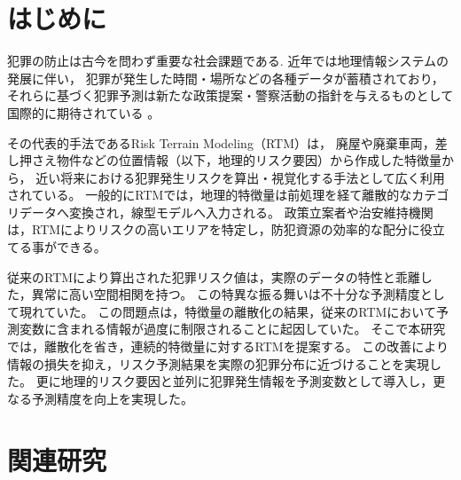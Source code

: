 \section{はじめに}
犯罪の防止は古今を問わず重要な社会課題である.
近年では地理情報システムの発展に伴い，
犯罪が発生した時間・場所などの各種データが蓄積されており\cite{ChicagoDataPortal}，
それらに基づく犯罪予測は新たな政策提案・警察活動の指針を与えるものとして国際的に期待されている
\cite{犯罪予測}。

その代表的手法であるRisk Terrain Modeling（RTM）\cite{caplan2015risk}は，
廃屋や廃棄車両，差し押さえ物件などの位置情報（以下，地理的リスク要因）から作成した特徴量から，
近い将来における犯罪発生リスクを算出・視覚化する手法として広く利用されている\cite{地理的犯罪予測研究の潮流}。
一般的にRTMでは，地理的特徴量は前処理を経て離散的なカテゴリデータへ変換され，線型モデルへ入力される\cite{犯罪予測, caplan2015risk}。
政策立案者や治安維持機関は，RTMによりリスクの高いエリアを特定し，防犯資源の効率的な配分に役立てる事ができる\cite{犯罪予測}。

従来のRTMにより算出された犯罪リスク値は，実際のデータの特性と乖離した，異常に高い空間相関を持つ。
この特異な振る舞いは不十分な予測精度として現れていた。
この問題点は，特徴量の離散化の結果，従来のRTMにおいて予測変数に含まれる情報が過度に制限されることに起因していた。
そこで本研究では，離散化を省き，連続的特徴量に対するRTMを提案する。
この改善により情報の損失を抑え，リスク予測結果を実際の犯罪分布に近づけることを実現した。
更に地理的リスク要因と並列に犯罪発生情報を予測変数として導入し，更なる予測精度を向上を実現した。

\section{関連研究}
\label{chapter_2}
